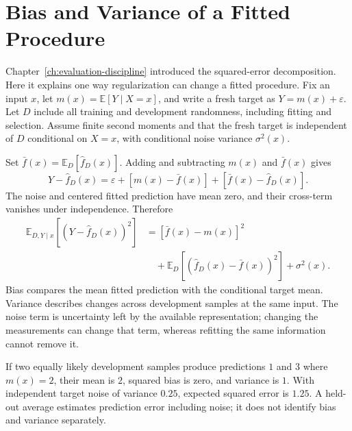 \section{Bias and Variance of a Fitted Procedure}
\label{sec:bias-variance}

Chapter~\ref{ch:evaluation-discipline} introduced the squared-error decomposition. Here it explains one way regularization can change a fitted procedure. Fix an input $x$, let $m(x)=\mathbb E[Y\mid X=x]$, and write a fresh target as $Y=m(x)+\varepsilon$. Let $D$ include all training and development randomness, including fitting and selection. Assume finite second moments and that the fresh target is independent of $D$ conditional on $X=x$, with conditional noise variance $\sigma^2(x)$.

Set $\bar f(x)=\mathbb E_D[\hat f_D(x)]$. Adding and subtracting $m(x)$ and $\bar f(x)$ gives
\[
Y-\hat f_D(x)=\varepsilon+[m(x)-\bar f(x)]+[\bar f(x)-\hat f_D(x)].
\]
The noise and centered fitted prediction have mean zero, and their cross-term vanishes under independence. Therefore
\begin{align*}
\mathbb E_{D,Y\mid x}[(Y-\hat f_D(x))^2]
&=[\bar f(x)-m(x)]^2\\
&\quad+\mathbb E_D[(\hat f_D(x)-\bar f(x))^2]+\sigma^2(x).
\end{align*}
Bias compares the mean fitted prediction with the conditional target mean. Variance describes changes across development samples at the same input. The noise term is uncertainty left by the available representation; changing the measurements can change that term, whereas refitting the same information cannot remove it.

If two equally likely development samples produce predictions $1$ and $3$ where $m(x)=2$, their mean is $2$, squared bias is zero, and variance is $1$. With independent target noise of variance $0.25$, expected squared error is $1.25$. A held-out average estimates prediction error including noise; it does not identify bias and variance separately.

